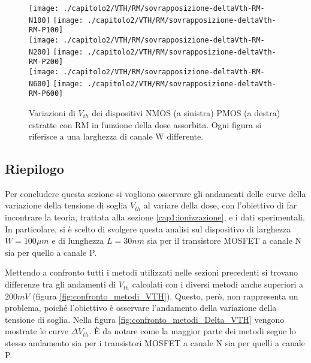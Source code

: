 \clearpage

\begin{figure}[ht]
  \centering
  \texttt{[image: ./capitolo2/VTH/RM/sovrapposizione-deltaVth-RM-N100]}
  \texttt{[image: ./capitolo2/VTH/RM/sovrapposizione-deltaVth-RM-P100]}\\
  \vspace{0.2cm}
  \texttt{[image: ./capitolo2/VTH/RM/sovrapposizione-deltaVth-RM-N200]}
  \texttt{[image: ./capitolo2/VTH/RM/sovrapposizione-deltaVth-RM-P200]}\\
  \vspace{0.2cm}
  \texttt{[image: ./capitolo2/VTH/RM/sovrapposizione-deltaVth-RM-N600]}
  \texttt{[image: ./capitolo2/VTH/RM/sovrapposizione-deltaVth-RM-P600]}
  \caption[Dati $\Delta V_{th}$ estratti con RM]{Variazioni di $V_{th}$ dei dispositivi NMOS (a sinistra) PMOS (a destra) estratte con RM in funzione della dose assorbita. Ogni figura si riferisce a una larghezza di canale W differente.}
  \label{fig:deltaVthRM}
\end{figure}

\FloatBarrier

\subsection{Riepilogo}
Per concludere questa sezione si vogliono osservare gli andamenti delle curve della variazione della tensione di soglia $V_{th}$ al variare della dose, con l'obiettivo di far incontrare la teoria, trattata alla sezione \ref{cap1:ionizzazione}, e i dati sperimentali.
In particolare, si è scelto di svolgere questa analisi sul dispositivo di larghezza $W = 100 \mu m$ e di lunghezza $L = 30 nm$ sia per il transistore MOSFET a canale N sia per quello a canale P. 

Mettendo a confronto tutti i metodi utilizzati nelle sezioni precedenti si trovano differenze tra gli andamenti di $V_{th}$ calcolati con i diversi metodi anche superiori a $200mV$ (figura \ref{fig:confronto_metodi_VTH}). Questo, però, non rappresenta un problema, poiché l'obiettivo è osservare l'andamento della variazione della tensione di soglia. Nella figura \ref{fig:confronto_metodi_Delta_VTH} vengono mostrate le curve $\Delta V_{th}$. È da notare come la maggior parte dei metodi segue lo stesso andamento sia per i transistori MOSFET a canale N sia per quelli a canale P.

